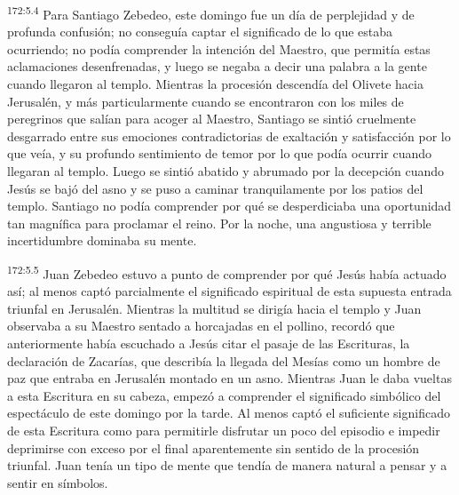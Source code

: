 \par 
\textsuperscript{172:5.4} Para Santiago Zebedeo, este domingo fue un día de perplejidad y de profunda confusión; no conseguía captar el significado de lo que estaba ocurriendo; no podía comprender la intención del Maestro, que permitía estas aclamaciones desenfrenadas, y luego se negaba a decir una palabra a la gente cuando llegaron al templo. Mientras la procesión descendía del Olivete hacia Jerusalén, y más particularmente cuando se encontraron con los miles de peregrinos que salían para acoger al Maestro, Santiago se sintió cruelmente desgarrado entre sus emociones contradictorias de exaltación y satisfacción por lo que veía, y su profundo sentimiento de temor por lo que podía ocurrir cuando llegaran al templo. Luego se sintió abatido y abrumado por la decepción cuando Jesús se bajó del asno y se puso a caminar tranquilamente por los patios del templo. Santiago no podía comprender por qué se desperdiciaba una oportunidad tan magnífica para proclamar el reino. Por la noche, una angustiosa y terrible incertidumbre dominaba su mente.

\par 
\textsuperscript{172:5.5} Juan Zebedeo estuvo a punto de comprender por qué Jesús había actuado así; al menos captó parcialmente el significado espiritual de esta supuesta entrada triunfal en Jerusalén. Mientras la multitud se dirigía hacia el templo y Juan observaba a su Maestro sentado a horcajadas en el pollino, recordó que anteriormente había escuchado a Jesús citar el pasaje de las Escrituras, la declaración de Zacarías, que describía la llegada del Mesías como un hombre de paz que entraba en Jerusalén montado en un asno. Mientras Juan le daba vueltas a esta Escritura en su cabeza, empezó a comprender el significado simbólico del espectáculo de este domingo por la tarde. Al menos captó el suficiente significado de esta Escritura como para permitirle disfrutar un poco del episodio e impedir deprimirse con exceso por el final aparentemente sin sentido de la procesión triunfal. Juan tenía un tipo de mente que tendía de manera natural a pensar y a sentir en símbolos.

